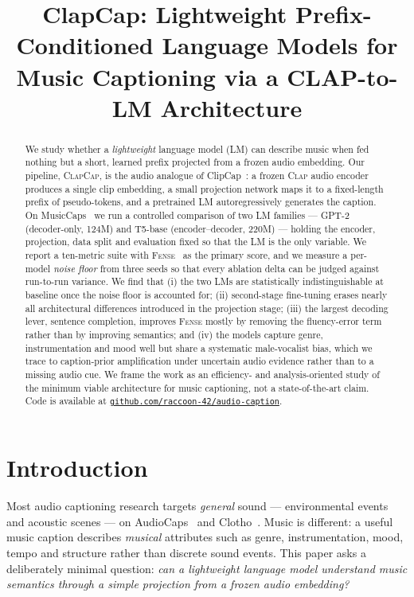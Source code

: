 \documentclass{article}
\title{ClapCap: Lightweight Prefix-Conditioned Language Models for Music Captioning via a CLAP-to-LM Architecture}
\newcommand{\fense}{\textsc{Fense}}
\newcommand{\clapenc}{\textsc{Clap}}
\newcommand{\sys}{\textsc{ClapCap}}
\begin{document}
\maketitle
\pagestyle{plain}\thispagestyle{plain}  %

\begin{abstract}
We study whether a \emph{lightweight} language model (LM) can describe music when fed
nothing but a short, learned prefix projected from a frozen audio embedding. Our pipeline,
\sys{}, is the audio analogue of ClipCap~\cite{mokady2021clipcap}: a frozen \clapenc{} audio
encoder produces a single clip embedding, a small projection network maps it to a fixed-length
prefix of pseudo-tokens, and a pretrained LM autoregressively generates the caption. On
MusicCaps~\cite{agostinelli2023musiclm} we run a controlled comparison of two LM families ---
GPT-2 (decoder-only, 124M) and T5-base (encoder--decoder, 220M) --- holding the encoder,
projection, data split and evaluation fixed so that the LM is the only variable. We report a
ten-metric suite with \fense{}~\cite{zhou2022fense} as the primary score, and we measure a
per-model \emph{noise floor} from three seeds so that every ablation delta can be judged against
run-to-run variance. We find that (i) the two LMs are statistically indistinguishable at
baseline once the noise floor is accounted for; (ii) second-stage fine-tuning erases nearly all
architectural differences introduced in the projection stage; (iii) the largest decoding lever,
sentence completion, improves \fense{} mostly by removing the fluency-error term rather than by
improving semantics; and (iv) the models capture genre, instrumentation and mood
well but share a systematic male-vocalist bias, which we trace to caption-prior amplification
under uncertain audio evidence rather than to a missing audio cue. We frame the work as an
efficiency- and analysis-oriented study of the minimum viable architecture for music captioning,
not a state-of-the-art claim. Code is available at
\href{https://github.com/raccoon-42/audio-caption}{\texttt{github.com/raccoon-42/audio-caption}}.
\end{abstract}

\section{Introduction}\label{sec:intro}

Most audio captioning research targets \emph{general} sound --- environmental events and
acoustic scenes --- on AudioCaps~\cite{kim2019audiocaps} and Clotho~\cite{drossos2020clotho}.
Music is different: a useful music caption describes \emph{musical} attributes such as genre,
instrumentation, mood, tempo and structure rather than discrete sound events. This paper asks a
deliberately minimal question: \emph{can a lightweight language model understand music semantics
through a simple projection from a frozen audio embedding?}
\end{document}
